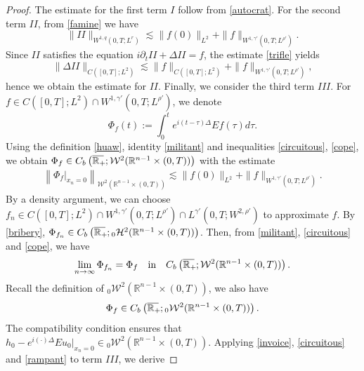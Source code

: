 \documentclass[preprint,compress,12pt]{elsarticle}
\numberwithin{equation}{section}
\begin{document}
\begin{proof}
	The estimate for the first term $I$ follow from \eqref{autocrat}. For the second term $II$, from \eqref{famine} we have
	\begin{equation}\label{trifle}		
		\|II\|_{W^{1,q}(0,T;L^{r})}\lesssim \|f(0)\|_{L^{2}}+\|f\|_{W^{1,\gamma'}(0,T;L^{\rho'})}.
	\end{equation}
	Since $II$ satisfies the equation $i\partial_{t}II+\Delta II=f$, the estimate \eqref{trifle} yields
	\begin{equation*}
		\|\Delta II\|_{C([0,T];L^{2})}\lesssim  \|f\|_{C([0,T];L^{2})}+\|f\|_{W^{1,\gamma'}(0,T;L^{\rho'})},
	\end{equation*}
	hence we obtain the estimate for $II$. Finally, we consider the third term $III$. For $f\in C([0,T];L^{2})\cap W^{1,\gamma'}(0,T;L^{\rho'})$, we denote
	\begin{equation*}
		\Phi_{f}(t):=\int_{0}^{t}e^{i(t-\tau)\Delta}Ef(\tau)d\tau.
	\end{equation*}
	Using the definition  \eqref{huaw}, identity \eqref{militant} and inequalities \eqref{circuitous}, \eqref{cope}, we obtain
	$\Phi_{f}\in C_{b}\left(\overline{\mathbb{R}_{+}\mkern-4mu}\,;\mathcal{W}^{2}(\mathbb{R}^{n-1}\times(0,T))\right)$ with the estimate
	\begin{equation}\label{rampant}
		\begin{aligned}
			\left\|\Phi_{f}|_{x_{n}=0}\right\|_{\mathcal{W}^{2}(\mathbb{R}^{n-1}\times(0,T))}\lesssim\|f(0)\|_{L^{2}}+\|f\|_{W^{1,\gamma'}(0,T;L^{\rho'})}.
		\end{aligned}
	\end{equation} By a density argument, we can choose $f_{n}\in C([0,T];L^{2})\cap W^{1,\gamma'}(0,T;L^{\rho'})\cap L^{\gamma'}(0,T;W^{2,\rho'})$ to approximate $f$. By
	\eqref{bribery}, $\Phi_{f_{n}}\in C_{b}\left(\overline{\mathbb{R}_{+}\mkern-4mu}\,;{}_{0}\mathcal{H}^{2}(\mathbb{R}^{n-1}\times(0,T))\right)$. Then, from \eqref{militant}, \eqref{circuitous} and \eqref{cope}, we have
	\[
	\lim\limits_{n\rightarrow\infty}\Phi_{f_{n}}= \Phi_{f}\quad \text{in} \quad C_{b}\left(\overline{\mathbb{R}_{+}\mkern-4mu}\,;\mathcal{W}^{2}(\mathbb{R}^{n-1}\times(0,T))\right).\]
	Recall the definition of ${}_{0}\mathcal{W}^{2}(\mathbb{R}^{n-1}\times(0,T))$, we also have
	\begin{equation*}
		\Phi_{f}\in C_{b}\left(\overline{\mathbb{R}_{+}\mkern-4mu}\,;{}_{0}\mathcal{W}^{2}(\mathbb{R}^{n-1}\times(0,T))\right).
	\end{equation*}
	The compatibility condition ensures that $h_{0}-e^{i(\cdot)\Delta}Eu_{0}|_{x_{n}=0}\in{}_{0}\mathcal{W}^{2}(\mathbb{R}^{n-1}\times(0,T))$. Applying \eqref{invoice}, \eqref{circuitous} and \eqref{rampant} to term $III$, we derive

\end{proof}
\end{document}
